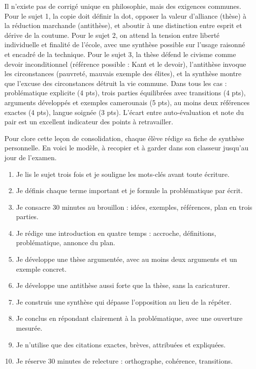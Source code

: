 \documentclass[11pt]{article}
\newcounter{popsec}
\newcounter{popsub}
\newcommand{\courssub}[1]{%
  \stepcounter{popsub}%
  \par\vspace{9pt}\noindent{\popxbold\fontsize{11.5}{13}\selectfont\color{popink}{\color{poporange}\thepopsec.\thepopsub}\hspace{6pt}#1}\par\nopagebreak\vspace{4pt}
}
\begin{document}
\begin{corrige}
Il n'existe pas de corrigé unique en philosophie, mais des exigences communes. Pour le sujet 1, la copie doit définir la dot, opposer la valeur d'alliance (thèse) à la réduction marchande (antithèse), et aboutir à une distinction entre esprit et dérive de la coutume. Pour le sujet 2, on attend la tension entre liberté individuelle et finalité de l'école, avec une synthèse possible sur l'usage raisonné et encadré de la technique. Pour le sujet 3, la thèse défend le civisme comme devoir inconditionnel (référence possible : Kant et le devoir), l'antithèse invoque les circonstances (pauvreté, mauvais exemple des élites), et la synthèse montre que l'excuse des circonstances détruit la vie commune. Dans tous les cas : problématique explicite (4 pts), trois parties équilibrées avec transitions (4 pts), arguments développés et exemples camerounais (5 pts), au moins deux références exactes (4 pts), langue soignée (3 pts). L'écart entre auto-évaluation et note du pair est un excellent indicateur des points à retravailler.
\end{corrige}

\courssub{Bilan de la leçon : ma méthode en 10 points}

Pour clore cette leçon de consolidation, chaque élève rédige sa fiche de synthèse personnelle. En voici le modèle, à recopier et à garder dans son classeur jusqu'au jour de l'examen.

\begin{aretenir}
\begin{enumerate}
\item Je lis le sujet trois fois et je souligne les mots-clés avant toute écriture.
\item Je définis chaque terme important et je formule la problématique par écrit.
\item Je consacre 30 minutes au brouillon : idées, exemples, références, plan en trois parties.
\item Je rédige une introduction en quatre temps : accroche, définitions, problématique, annonce du plan.
\item Je développe une thèse argumentée, avec au moins deux arguments et un exemple concret.
\item Je développe une antithèse aussi forte que la thèse, sans la caricaturer.
\item Je construis une synthèse qui dépasse l'opposition au lieu de la répéter.
\item Je conclus en répondant clairement à la problématique, avec une ouverture mesurée.
\item Je n'utilise que des citations exactes, brèves, attribuées et expliquées.
\item Je réserve 30 minutes de relecture : orthographe, cohérence, transitions.
\end{enumerate}
\end{aretenir}
\end{document}
